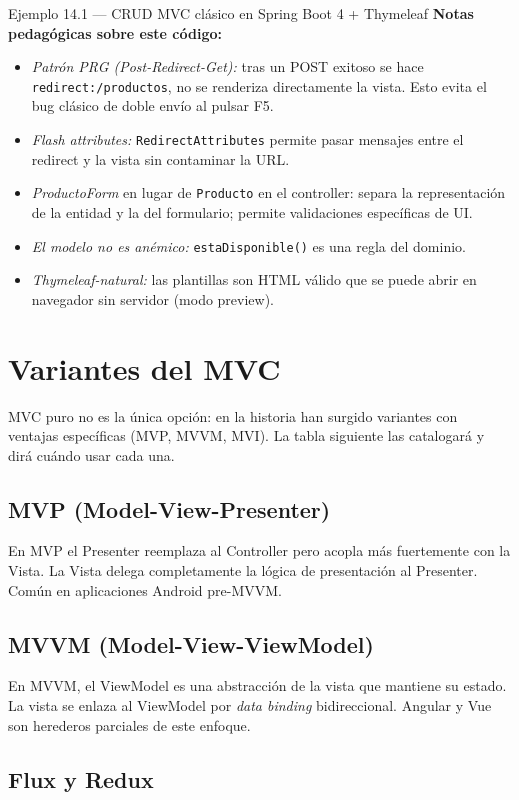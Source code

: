 \begin{cajaejemplo}{Ejemplo 14.1 --- CRUD MVC clásico en Spring Boot 4 + Thymeleaf}
\textbf{Notas pedagógicas sobre este código:}
\begin{itemize}
\item \emph{Patrón PRG (Post-Redirect-Get):} tras un POST exitoso se
hace \texttt{redirect:/productos}, no se renderiza directamente la
vista. Esto evita el bug clásico de doble envío al pulsar F5.
\item \emph{Flash attributes:} \texttt{RedirectAttributes} permite
pasar mensajes entre el redirect y la vista sin contaminar la URL.
\item \emph{ProductoForm} en lugar de \texttt{Producto} en el
controller: separa la representación de la entidad y la del
formulario; permite validaciones específicas de UI.
\item \emph{El modelo no es anémico:} \texttt{estaDisponible()} es
una regla del dominio.
\item \emph{Thymeleaf-natural:} las plantillas son HTML válido que se
puede abrir en navegador sin servidor (modo preview).
\end{itemize}
\end{cajaejemplo}

\section{Variantes del MVC}

MVC puro no es la única opción: en la historia han surgido
variantes con ventajas específicas (MVP, MVVM, MVI). La tabla
siguiente las catalogará y dirá cuándo usar cada una.


\subsection{MVP (Model-View-Presenter)}

En MVP el Presenter reemplaza al Controller pero acopla más
fuertemente con la Vista. La Vista delega completamente la lógica de
presentación al Presenter. Común en aplicaciones Android pre-MVVM.

\subsection{MVVM (Model-View-ViewModel)}

En MVVM, el ViewModel es una abstracción de la vista que mantiene su
estado. La vista se enlaza al ViewModel por \emph{data binding}
bidireccional. Angular y Vue son herederos parciales de este enfoque.

\subsection{Flux y Redux}

